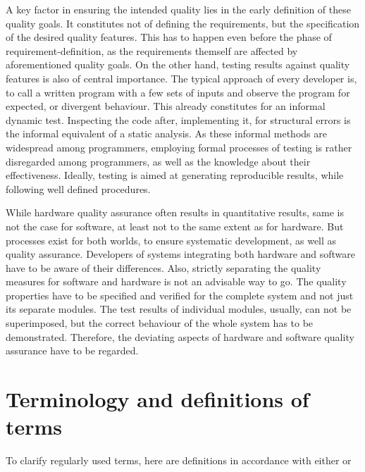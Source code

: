\documentclass[master,english,smartquotes,apa]{hgbthesis}
\begin{document}
A key factor in ensuring the intended quality lies in the early definition of these quality goals. It constitutes not of defining the requirements, but the specification of the desired quality features. This has to happen even before the phase of requirement-definition, as the requirements themself are affected by aforementioned quality goals. On the other hand, testing results against quality features is also of central importance. The typical approach of every developer is, to call a written program with a few sets of inputs and observe the program for expected, or divergent behaviour. This already constitutes for an informal dynamic test. Inspecting the code after, implementing it, for structural errors is the informal equivalent of a static analysis. As these informal methods are widespread among programmers, employing formal processes of testing is rather disregarded among programmers, as well as the knowledge about their effectiveness. Ideally, testing is aimed at generating reproducible results, while following well defined procedures.

While hardware quality assurance often results in quantitative results, same is not the case for software, at least not to the same extent as for hardware. But processes exist for both worlds, to ensure systematic development, as well as quality assurance. Developers of systems integrating both hardware and software have to be aware of their differences. Also, strictly separating the quality measures for software and hardware is not an advisable way to go. The quality properties have to be specified and verified for the complete system and not just its separate modules. The test results of individual modules, usually, can not be superimposed, but the correct behaviour of the whole system has to be demonstrated. Therefore, the deviating aspects of hardware and software quality assurance have to be regarded.
	
	\section{Terminology and definitions of terms}
	To clarify regularly used terms, here are definitions in accordance with either \cite{Kopetz1997} or \cite{Liggesmeyer2002}
\end{document}
